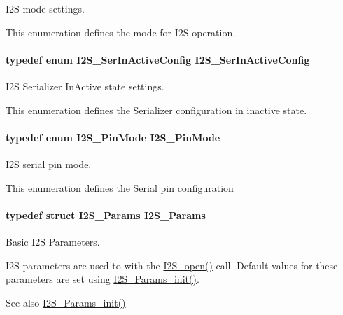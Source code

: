 I2\+S mode settings. 

This enumeration defines the mode for I2\+S operation. 
\paragraph[{I2\+S\+\_\+\+Ser\+In\+Active\+Config}]{\setlength{\rightskip}{0pt plus 5cm}typedef enum {\bf I2\+S\+\_\+\+Ser\+In\+Active\+Config}  {\bf I2\+S\+\_\+\+Ser\+In\+Active\+Config}}\label{_i2_s_8h_a19123e5e2c577320f90558cfc640e918}


I2\+S Serializer In\+Active state settings. 

This enumeration defines the Serializer configuration in inactive state. 
\paragraph[{I2\+S\+\_\+\+Pin\+Mode}]{\setlength{\rightskip}{0pt plus 5cm}typedef enum {\bf I2\+S\+\_\+\+Pin\+Mode}  {\bf I2\+S\+\_\+\+Pin\+Mode}}\label{_i2_s_8h_ac3246d834f54bb71d4b58fe945cb9228}


I2\+S serial pin mode. 

This enumeration defines the Serial pin configuration 
\paragraph[{I2\+S\+\_\+\+Params}]{\setlength{\rightskip}{0pt plus 5cm}typedef struct {\bf I2\+S\+\_\+\+Params}  {\bf I2\+S\+\_\+\+Params}}\label{_i2_s_8h_afff1198c952846b6248c11a68f5927ff}


Basic I2\+S Parameters. 

I2\+S parameters are used to with the \hyperlink{_i2_s_8h_aad4ce7cbdf38dc5597f5a92ad056ebc1}{I2\+S\+\_\+open()} call. Default values for these parameters are set using \hyperlink{_i2_s_8h_a961c116273a6e8d4581278b2666f13b5}{I2\+S\+\_\+\+Params\+\_\+init()}.

\begin{DoxySeeAlso}{See also}
\hyperlink{_i2_s_8h_a961c116273a6e8d4581278b2666f13b5}{I2\+S\+\_\+\+Params\+\_\+init()} 
\end{DoxySeeAlso}
